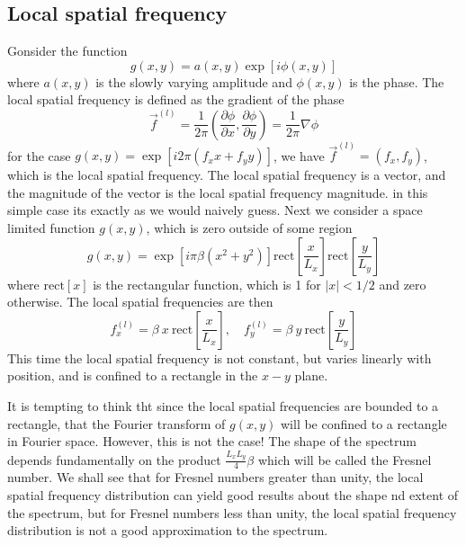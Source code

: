 \documentclass[../../main.tex]{subfiles}
\begin{document}
\subsection{Local spatial frequency}
Gonsider the function 
\begin{equation}\label{eq. general function1}
    g(x,y)=a(x,y)\exp{\left[i\phi(x,y)\right]}
\end{equation}
where $a(x,y)$ is the slowly varying amplitude and $\phi(x,y)$ is the phase. The local spatial frequency is defined as the gradient of the phase
\begin{equation}\label{eq. local spatial frequency}
    \vec{f}^{(l)}=\frac{1}{2\pi}\left(\frac{\partial\phi}{\partial x},\frac{\partial\phi}{\partial y}\right)=\frac{1}{2\pi}\nabla\phi
\end{equation}
for the case $g(x,y)=\exp{[i2\pi(f_xx+f_yy)]}$, we have $\vec{f}^{(l)}=(f_x,f_y)$, which is the local spatial frequency. The local spatial frequency is a vector, and the magnitude of the vector is the local spatial frequency magnitude.
in this simple case its exactly as we would naively guess. Next we consider a space limited function $g(x,y)$, which is zero outside of some region 
\begin{equation}\label{eq. finite chirp}
    g(x,y)=\exp{[i\pi\beta(x^2+y^2)]}\text{rect}\left[\frac{x}{L_x}\right]\text{rect}\left[\frac{y}{L_y}\right]
\end{equation}
where $\text{rect}[x]$ is the rectangular function, which is 1 for $|x|<1/2$ and zero otherwise. The local spatial frequencies are then
\begin{equation}
    f^{(l)}_x=\beta\: x\:\text{rect}\left[\frac{x}{L_x}\right],\quad f^{(l)}_y=\beta\: y\:\text{rect}\left[\frac{y}{L_y}\right]
\end{equation}
This time the local spatial frequency is not constant, but varies linearly with position, and is confined to a rectangle in the $x-y$ plane. 

It is tempting to think tht since the local spatial frequencies are bounded to a rectangle, that the Fourier transform of $g(x,y)$ will be confined to a rectangle in Fourier space. However, this is not the case! The shape of the spectrum depends fundamentally on the product $\frac{L_xL_y}{4}\beta$ which will be called the Fresnel number. We shall see that for Fresnel numbers greater than unity, the local spatial frequency distribution can yield good results about the shape nd extent of the spectrum, but for Fresnel numbers less than unity, the local spatial frequency distribution is not a good approximation to the spectrum.
\end{document}
